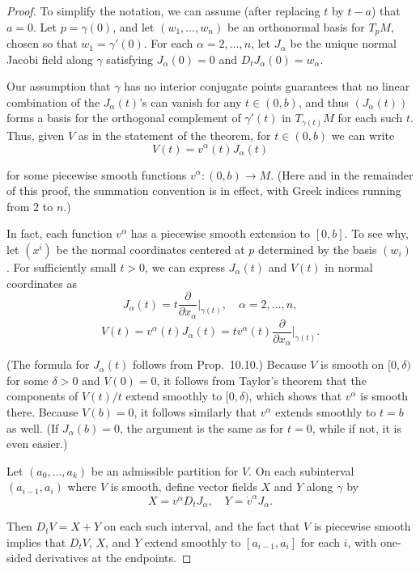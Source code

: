 \begin{proof}
To simplify the notation, we can assume (after replacing $t$ by $t - a$) that $a = 0$. Let $p = \gamma(0)$, and let $(w_1,\ldots,w_n)$ be an orthonormal basis for $T_p M$, chosen so that $w_1 = \gamma'(0)$. For each $\alpha = 2, \ldots, n$, let $J_\alpha$ be the unique normal Jacobi field along $\gamma$ satisfying $J_\alpha(0) = 0$ and $D_t J_\alpha(0) = w_\alpha$.

Our assumption that $\gamma$ has no interior conjugate points guarantees that no linear combination of the $J_\alpha(t)$'s can vanish for any $t \in (0, b)$, and thus $(J_\alpha(t))$ forms a basis for the orthogonal complement of $\gamma'(t)$ in $T_{\gamma(t)} M$ for each such $t$. Thus, given $V$ as in the statement of the theorem, for $t \in (0, b)$ we can write
\begin{equation}
V(t) = v^\alpha(t) J_\alpha(t) \tag{10.25}
\end{equation}

for some piecewise smooth functions $v^\alpha : (0, b) \to M$. (Here and in the remainder of this proof, the summation convention is in effect, with Greek indices running from $2$ to $n$.)

In fact, each function $v^\alpha$ has a piecewise smooth extension to $[0, b]$. To see why, let $(x^i)$ be the normal coordinates centered at $p$ determined by the basis $(w_i)$. For sufficiently small $t > 0$, we can express $J_\alpha(t)$ and $V(t)$ in normal coordinates as
\[
J_\alpha(t) = t \frac{\partial}{\partial x_\alpha}\Big|_{\gamma(t)}, \quad \alpha = 2, \ldots, n,
\]
\[
V(t) = v^\alpha(t) J_\alpha(t) = t v^\alpha(t) \frac{\partial}{\partial x_\alpha}\Big|_{\gamma(t)}.
\]

(The formula for $J_\alpha(t)$ follows from Prop.\ 10.10.) Because $V$ is smooth on $[0, \delta)$ for some $\delta > 0$ and $V(0) = 0$, it follows from Taylor's theorem that the components of $V(t)/t$ extend smoothly to $[0, \delta)$, which shows that $v^\alpha$ is smooth there. Because $V(b) = 0$, it follows similarly that $v^\alpha$ extends smoothly to $t = b$ as well. (If $J_\alpha(b) = 0$, the argument is the same as for $t = 0$, while if not, it is even easier.)

Let $(a_0, \ldots, a_k)$ be an admissible partition for $V$. On each subinterval $(a_{i-1}, a_i)$ where $V$ is smooth, define vector fields $X$ and $Y$ along $\gamma$ by
\[
X = v^\alpha D_t J_\alpha, \quad Y = \dot{v}^\alpha J_\alpha.
\]

Then $D_t V = X + Y$ on each such interval, and the fact that $V$ is piecewise smooth implies that $D_t V$, $X$, and $Y$ extend smoothly to $[a_{i-1}, a_i]$ for each $i$, with one-sided derivatives at the endpoints.


\end{proof}
